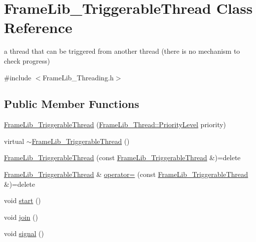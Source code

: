 \hypertarget{class_frame_lib___triggerable_thread}{}\section{Frame\+Lib\+\_\+\+Triggerable\+Thread Class Reference}
\label{class_frame_lib___triggerable_thread}


a thread that can be triggered from another thread (there is no mechanism to check progress)  




{\ttfamily \#include $<$Frame\+Lib\+\_\+\+Threading.\+h$>$}

\subsection*{Public Member Functions}
\begin{DoxyCompactItemize}
\item 
\hyperlink{class_frame_lib___triggerable_thread_aadb78b7fcf753d3d3f98bdb234d9db42}{Frame\+Lib\+\_\+\+Triggerable\+Thread} (\hyperlink{class_frame_lib___thread_a99a5e56edcadf37e3388f5557e8ec7ed}{Frame\+Lib\+\_\+\+Thread\+::\+Priority\+Level} priority)
\item 
virtual \hyperlink{class_frame_lib___triggerable_thread_a443b8f9470e10c6cf322c6f77bc792e1}{$\sim$\+Frame\+Lib\+\_\+\+Triggerable\+Thread} ()
\item 
\hyperlink{class_frame_lib___triggerable_thread_a8ad89a62e0d772fe59fcd9f86a93ec87}{Frame\+Lib\+\_\+\+Triggerable\+Thread} (const \hyperlink{class_frame_lib___triggerable_thread}{Frame\+Lib\+\_\+\+Triggerable\+Thread} \&)=delete
\item 
\hyperlink{class_frame_lib___triggerable_thread}{Frame\+Lib\+\_\+\+Triggerable\+Thread} \& \hyperlink{class_frame_lib___triggerable_thread_af0038c2c3d65d11c934413926e9a2ab0}{operator=} (const \hyperlink{class_frame_lib___triggerable_thread}{Frame\+Lib\+\_\+\+Triggerable\+Thread} \&)=delete
\item 
void \hyperlink{class_frame_lib___triggerable_thread_a69f8246eb1ad71c06b58e270de4e3107}{start} ()
\item 
void \hyperlink{class_frame_lib___triggerable_thread_a7567b1f7fe8f262f02d60c470aed5e0d}{join} ()
\item 
void \hyperlink{class_frame_lib___triggerable_thread_a7120d3757c35e62777eb1c20fea6f93f}{signal} ()
\end{DoxyCompactItemize}


